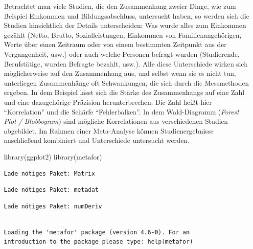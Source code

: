 \documentclass[
  letterpaper,
  DIV=11,
  numbers=noendperiod]{scrreprt}
\newenvironment{Shaded}{\begin{snugshade}}{\end{snugshade}}
\newcommand{\FunctionTok}[1]{\textcolor[rgb]{0.28,0.35,0.67}{#1}}
\newcommand{\NormalTok}[1]{\textcolor[rgb]{0.00,0.23,0.31}{#1}}
\begin{document}
Betrachtet man viele Studien, die den Zusammenhang zweier Dinge, wie zum
Beispiel Einkommen und Bildungsabschluss, untersucht haben, so werden
sich die Studien hinsichtlich der Details unterscheiden: Was wurde alles
zum Einkommen gezählt (Netto, Brutto, Sozialleistungen, Einkommen von
Familienangehörigen, Werte über einen Zeitraum oder von einem bestimmten
Zeitpunkt aus der Vergangenheit, usw.) oder auch welche Personen befragt
wurden (Studierende, Berufstätige, wurden Befragte bezahlt, usw.). Alle
diese Unterschiede wirken sich möglicherweise auf den Zusammenhang aus,
und selbst wenn sie es nicht tun, unterliegen Zusammenhänge oft
Schwankungen, die sich durch die Messmethoden ergeben. In dem Beispiel
lässt sich die Stärke des Zusammenhangs auf eine Zahl und eine
dazugehörige Präzision herunterbrechen. Die Zahl heißt hier
``Korrelation'' und die Schärfe ``Fehlerbalken''. In dem Wald-Diagramm
(\emph{Forest Plot / Blobbogram}) sind mögliche Korrelationen aus
verschiedenen Studien abgebildet. Im Rahmen einer Meta-Analyse können
Studienergebnisse anschließend kombiniert und Unterschiede untersucht
werden.

\begin{Shaded}
\begin{Highlighting}[]
\FunctionTok{library}\NormalTok{(ggplot2)}
\FunctionTok{library}\NormalTok{(metafor)}
\end{Highlighting}
\end{Shaded}

\begin{verbatim}
Lade nötiges Paket: Matrix
\end{verbatim}

\begin{verbatim}
Lade nötiges Paket: metadat
\end{verbatim}

\begin{verbatim}
Lade nötiges Paket: numDeriv
\end{verbatim}

\begin{verbatim}

Loading the 'metafor' package (version 4.6-0). For an
introduction to the package please type: help(metafor)
\end{verbatim}
\end{document}
